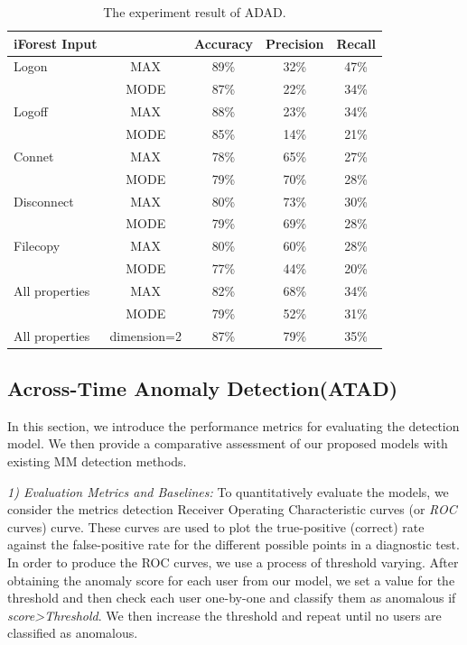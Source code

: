 \documentclass[conference]{IEEEtran}
\begin{document}
\begin{table}[tbp]
\caption{The experiment result of ADAD.}
\centering  %
\begin{tabular}{lcccc}  %
\hline
iForest Input & 	&Accuracy &Precision &Recall\\ \hline
	
Logon 	& MAX &89\% &32\% &47\%\\
  & MODE &87\% &22\% &34\%\\\hline
Logoff 	& MAX &88\% &23\% &34\%\\
   & MODE &85\% &14\% &21\%\\\hline
Connet 	& MAX &78\% &65\% &27\%\\
  & MODE &79\% &70\% &28\%\\\hline
Disconnect 	& MAX &80\% &73\% &30\%\\
  & MODE &79\% &69\% &28\%\\\hline
Filecopy 	& MAX &80\% &60\% &28\%\\
  & MODE &77\% &44\% &20\%\\\hline
All properties 	& MAX &82\% &68\% &34\%\\
  & MODE &79\% &52\% &31\%\\\hline
All properties 	& dimension=2 &87\% &79\% &35\%\\\hline

\end{tabular}

\end{table}


\subsection{Across-Time Anomaly Detection(ATAD)}
In this section, we introduce the performance metrics for
evaluating the detection model. We then provide a
comparative assessment of our proposed models with existing MM detection methods.

\emph{1) Evaluation Metrics and Baselines:}
To quantitatively evaluate the models, we consider the metrics detection Receiver
Operating Characteristic curves (or \emph{ROC} curves) curve. These curves are used to plot the true-positive (correct) rate against the false-positive rate for the different possible points in a diagnostic test. In order to produce the ROC curves, we use a process of threshold varying. After obtaining the anomaly score for each user from our model, we set a value for
the threshold and then check each user one-by-one and
classify them as anomalous if \emph{score>Threshold}.
We then increase the threshold and repeat until no users are classified as anomalous.
\end{document}
